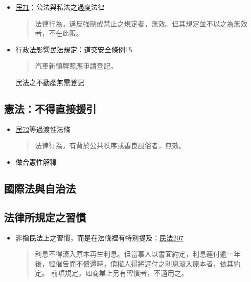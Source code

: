 \documentclass[
]{book}
\begin{document}
\begin{itemize}
\item
  \href{https://law.moj.gov.tw/LawClass/LawSingle.aspx?pcode=B0000001\&flno=71}{民71}：公法與私法之過度法律

  \begin{quote}
  法律行為，違反強制或禁止之規定者，無效。但其規定並不以之為無效者，不在此限。
  \end{quote}
\item
  行政法影響民法規定：\href{https://law.moj.gov.tw/LawClass/LawSingle.aspx?pcode=K0040013\&flno=15}{道交安全條例15}

  \begin{quote}
  汽車新領牌照應申請登記。
  \end{quote}

  民法之不動產無需登記
\end{itemize}

\hypertarget{ux61b2ux6cd5ux4e0dux5f97ux76f4ux63a5ux63f4ux5f15}{%
\subsection{憲法：不得直接援引}\label{ux61b2ux6cd5ux4e0dux5f97ux76f4ux63a5ux63f4ux5f15}}

\begin{itemize}
\item
  \href{https://law.moj.gov.tw/LawClass/LawSingle.aspx?pcode=B0000001\&flno=72}{民72}等過渡性法條

  \begin{quote}
  法律行為，有背於公共秩序或善良風俗者，無效。
  \end{quote}
\item
  做合憲性解釋
\end{itemize}

\hypertarget{ux570bux969bux6cd5ux8207ux81eaux6cbbux6cd5}{%
\subsection{國際法與自治法}\label{ux570bux969bux6cd5ux8207ux81eaux6cbbux6cd5}}

\pagebreak

\hypertarget{ux6cd5ux5f8bux6240ux898fux5b9aux4e4bux7fd2ux6163}{%
\subsection{法律所規定之習慣}\label{ux6cd5ux5f8bux6240ux898fux5b9aux4e4bux7fd2ux6163}}

\begin{itemize}
\item
  非指民法上之習慣，而是在法條裡有特別提及：\href{https://law.moj.gov.tw/LawClass/LawSingle.aspx?pcode=B0000001\&flno=207}{民法207}

  \begin{quote}
  利息不得滾入原本再生利息。但當事人以書面約定，利息遲付逾一年後，經催告而不償還時，債權人得將遲付之利息滾入原本者，依其約定。
  前項規定，如商業上另有習慣者，不適用之。
  \end{quote}
\end{itemize}
\end{document}
